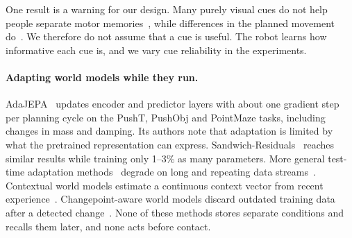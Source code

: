 \documentclass[10pt]{article}
\begin{document}
One result is a warning for our design. Many purely visual cues do not help people separate motor
memories~\cite{howard2013contextual}, while differences in the planned movement do~\cite{sheahan2016planning}.
We therefore do not assume that a cue is useful. The robot learns how informative each cue is, and we
vary cue reliability in the experiments.

\paragraph{Adapting world models while they run.}
AdaJEPA~\cite{wang2026adajepa} updates encoder and predictor layers with about one gradient step per
planning cycle on the PushT, PushObj and PointMaze tasks, including changes in mass and damping. Its
authors note that adaptation is limited by what the pretrained representation can express.
Sandwich-Residuals~\cite{soni2026sandwich} reaches similar results while training only 1--3\% as many
parameters. More general test-time adaptation methods~\cite{sun2020ttt,wang2021tent,wang2022cotta}
degrade on long and repeating data streams~\cite{press2023rdumb,hoang2024petta}. Contextual world
models estimate a continuous context vector from recent
experience~\cite{roder2025dali,benad2026dmash,lee2020context}. Changepoint-aware world models
discard outdated training data after a detected change~\cite{yang2026cawm}. None of these methods
stores separate conditions and recalls them later, and none acts before contact.
\end{document}
